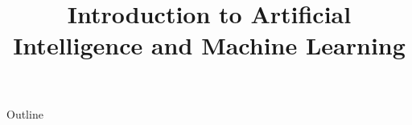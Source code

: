 \documentclass[xcolor=dvipsnames,compress,t,pdf,notes,9pt]{beamer}
\title[\insertframenumber /\inserttotalframenumber]{Introduction to Artificial Intelligence and Machine Learning}
\begin{document}
	\begin{frame}
	\titlepage
	\end{frame}
	
	\begin{frame}{Outline}
	    \tableofcontents
	\end{frame}

	
	
	
	
	
\end{document}
